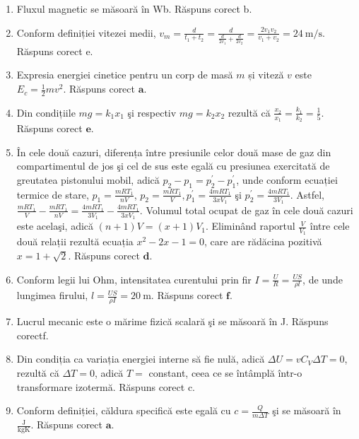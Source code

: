 \begin{enumerate}
  \item Fluxul magnetic se măsoară în Wb. Răspuns corect b.
  \item Conform definiției vitezei medii, $v_{m}=\frac{d}{t_{1}+t_{2}}=\frac{d}{\frac{d}{2 v_{1}}+\frac{d}{2 v_{2}}}=\frac{2 v_{1} v_{2}}{v_{1}+v_{2}}=24 \mathrm{~m} / \mathrm{s}$. Răspuns corect e.
  \item Expresia energiei cinetice pentru un corp de masă $m$ și viteză $v$ este $E_{c}=\frac{1}{2} m v^{2}$. Răspuns corect $\boldsymbol{a}$.
  \item Din condițiile $m g=k_{1} x_{1}$ şi respectiv $m g=k_{2} x_{2}$ rezultă că $\frac{x_{2}}{x_{1}}=\frac{k_{1}}{k_{2}}=\frac{1}{5}$. Răspuns corect $\boldsymbol{e}$.
  \item În cele două cazuri, diferența între presiunile celor două mase de gaz din compartimentul de jos şi cel de sus este egală cu presiunea exercitată de greutatea pistonului mobil, adică $p_{2}-p_{1}=p_{2}^{\prime}-p_{1}^{\prime}$, unde conform ecuației termice de stare, $p_{1}=\frac{m R T_{1}}{n V}$, $p_{2}=\frac{m R T_{1}}{V}, p_{1}^{\prime}=\frac{4 m R T_{1}}{3 x V_{1}}$ şi $p_{2}^{\prime}=\frac{4 m R T_{1}}{3 V_{1}}$. Astfel, $\frac{m R T_{1}}{V}-\frac{m R T_{1}}{n V}=\frac{4 m R T_{1}}{3 V_{1}}-\frac{4 m R T_{1}}{3 x V_{1}}$. Volumul total ocupat de gaz în cele două cazuri este acelaşi, adică $(n+1) V=(x+1) V_{1}$. Eliminând raportul $\frac{V}{V_{1}}$ între cele două relații rezultă ecuația $x^{2}-2 x-1=0$, care are rădăcina pozitivă $x=1+\sqrt{2}$. Răspuns corect $\boldsymbol{d}$.
  \item Conform legii lui Ohm, intensitatea curentului prin fir $I=\frac{U}{R}=\frac{U S}{\rho l}$, de unde lungimea firului, $l=\frac{U S}{\rho I}=20 \mathrm{~m}$. Răspuns corect $\boldsymbol{f}$.
  \item Lucrul mecanic este o mărime fizică scalară şi se măsoară în J. Răspuns corectf.
  \item Din condiția ca variația energiei interne să fie nulă, adică $\Delta U=v C_{V} \Delta T=0$, rezultă că $\Delta T=0$, adică $T=$ constant, ceea ce se întâmplă într-o transformare izotermă. Răspuns corect c.
  \item Conform definiției, căldura specifică este egală cu $c=\frac{Q}{m \Delta T}$ şi se măsoară în $\frac{\mathrm{J}}{\mathrm{kg} \mathrm{K}}$. Răspuns corect $\boldsymbol{a}$.
\end{enumerate}

